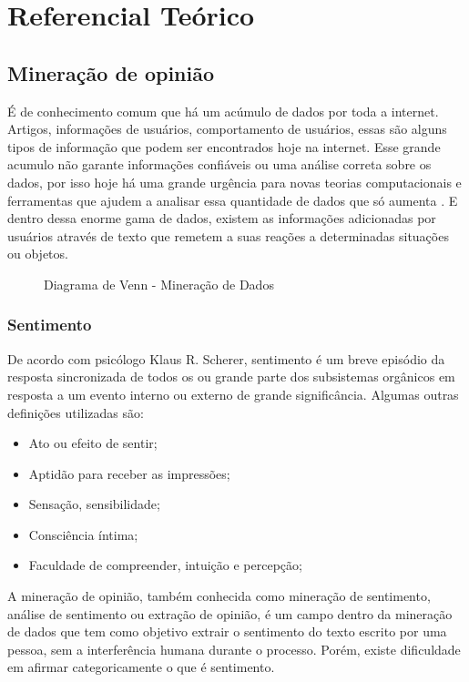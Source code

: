 \chapter{Referencial Teórico}\label{cap:referencial_teorico}

\section{Mineração de opinião}\label{sec:mineracao_dados}

É de conhecimento comum que há um acúmulo de dados por toda a internet. Artigos, informações de usuários, comportamento de usuários, essas são alguns tipos de informação que podem ser encontrados hoje na internet. Esse grande acumulo não garante informações confiáveis ou uma análise correta sobre os dados, por isso hoje há uma grande urgência para novas teorias computacionais e ferramentas que ajudem a analisar essa quantidade de dados que só aumenta \cite{fayyad1996data}. E dentro dessa enorme gama de dados, existem as informações adicionadas por usuários através de texto que remetem a suas reações a determinadas situações ou objetos.

\begin{figure}[ht]
	\centering{}
	\caption{Diagrama de Venn - Mineração de Dados}
	\label{uni}
\end{figure}

\subsection{Sentimento}
De acordo com psicólogo Klaus R. Scherer, sentimento é um breve episódio da resposta sincronizada de todos os ou grande parte dos subsistemas orgânicos em resposta a um evento interno ou externo de grande significância\cite{scherer2001emotional}. Algumas outras definições utilizadas são:
\begin{itemize}
	\item Ato ou efeito de sentir;
	\item Aptidão para receber as impressões;
	\item Sensação, sensibilidade;
	\item Consciência íntima;
	\item Faculdade de compreender, intuição e percepção;
\end{itemize}

A mineração de opinião, também conhecida como mineração de sentimento, análise de sentimento ou extração de opinião, é um campo dentro da mineração de dados \cite{santos2014mineraccao} que tem como objetivo extrair o sentimento do texto escrito por uma pessoa, sem a interferência humana durante o processo. Porém, existe dificuldade em afirmar categoricamente o que é sentimento. 

